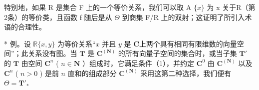 特别地，如果 R 是集合 F 上的一个等价关系，我们可以取 A \(\{x\}\) 为 x 关于R（第2条）的等价类，且函数 f 随后是从 \(\Theta\) 到商集 F/R 上的双射；这证明了所引入术语的合理性。

* 例。设 \(\mathbb{R}\{x, y\}\) 为等价关系“\(x\) 并且 \(y\) 是 \(\mathbf{C}\)上两个具有相同有限维数的向量空间”；此关系没有图。当 \(\mathbf{T}\) 是 \(\mathbf{C}^{(\mathbf{N})}\) 的所有向量子空间的集合时，或当子集 \(\mathbf{T}'\) 的 \(\mathbf{T}\) 由空间 \(\mathbf{C}^n\) ( \(n \in \mathbf{N}\) ）组成时，它满足条件（1），并约定 \(\mathbf{C}^0\) 由 \(\mathbf{C}^{(\mathbf{N})}\) 以及 \(\mathbf{C}^n\) ( \(n > 0\) ) 是前 \(n\) 直和的组成部分 \(\mathbf{C}^{(\mathbf{N})}\) 采用这第二种选择，我们便有 \(\Theta = \mathbf{T}'_*\)

